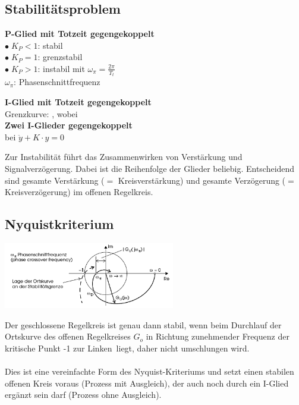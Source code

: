 
	\newpage

	\subsection{Stabilitätsproblem }
	\begin{multicols}{2}	
        
        \textbf{P-Glied mit Totzeit gegengekoppelt }\\
        	$\bullet \; K_P < 1$: stabil\\
        	$\bullet \; K_P = 1$: grenzstabil\\
        	$\bullet \; K_P > 1$: instabil mit $\omega_{\pi} = \frac{2\pi}{T_t}$\\
        	$\omega_\pi$: Phasenschnittfrequenz
        	
       	\columnbreak
        	
		\textbf{I-Glied mit Totzeit gegengekoppelt }\\
			Grenzkurve: , wobei \\
        
        \textbf{Zwei I-Glieder gegengekoppelt }\\
        	bei $\ddot{y} + K \cdot y = 0$
	\end{multicols}
	Zur Instabilität führt das Zusammenwirken von Verstärkung und Signalverzögerung. Dabei ist die Reihenfolge der Glieder beliebig. Entscheidend sind gesamte Verstärkung ($=$ Kreisverstärkung) und gesamte Verzögerung ($=$ Kreisverzögerung) im offenen Regelkreis.

	\subsection{Nyquistkriterium }
		\begin{minipage}{8cm}
			\includegraphics[width = 7.5cm]{./images/Nyquistkurve}
		\end{minipage}
		\begin{minipage}{10cm}
			Der geschlossene Regelkreis ist genau dann stabil, wenn beim Durchlauf der
			Ortskurve des offenen Regelkreises $G_o$ in Richtung zunehmender Frequenz der kritische Punkt -1 \glqq zur Linken\grqq\ liegt, daher nicht umschlungen wird. \\ \\ 
			Dies ist eine vereinfachte Form des Nyquist-Kriteriums und setzt einen stabilen offenen Kreis voraus (Prozess mit Ausgleich), der auch noch durch ein I-Glied ergänzt sein darf (Prozess ohne Ausgleich).
		\end{minipage}
		 
